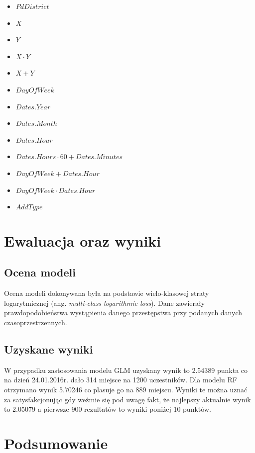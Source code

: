 \documentclass[11pt]{article} %
\begin{document}
\begin{itemize}
\item $PdDistrict$

\item $X $
\item $Y $
\item $X \cdot Y$
\item $X + Y$ 
\item $DayOfWeek$
\item $Dates.Year $
\item $Dates.Month $
\item $Dates.Hour $
\item $Dates.Hours \cdot 60 + Dates.Minutes$ 
\item $DayOfWeek + Dates.Hour $
\item $DayOfWeek \cdot Dates.Hour $

\item $AddType $

\end{itemize}



\section{Ewaluacja oraz wyniki}

\subsection{Ocena modeli}

Ocena modeli dokonywana była na podstawie wielo-klasowej straty logarytmicznej (ang. \textit{multi-class logarithmic loss}). Dane zawierały prawdopodobieństwa wystąpienia danego przestępstwa przy podanych danych czasoprzestrzennych. \\

\subsection{Uzyskane wyniki}


W przypadku zastosowania modelu GLM uzyskany wynik to 2.54389 punkta co na dzień 24.01.2016r. dało 314 miejsce na 1200 uczestników. Dla modelu RF otrzymano wynik 5.70246 co plasuje go na 889 miejscu. Wyniki te można uznać za satysfakcjonując gdy weźmie się pod uwagę fakt, że najlepszy aktualnie wynik to 2.05079 a pierwsze 900 rezultatów to wyniki poniżej 10 punktów.\\


\section{Podsumowanie}
\end{document}
